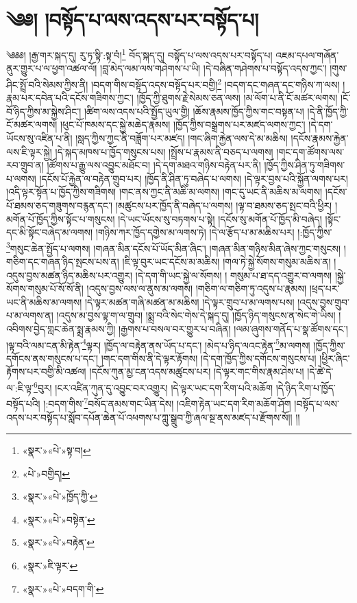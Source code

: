 \chapter{༄༅། །བསྟོད་པ་ལས་འདས་པར་བསྟོད་པ།}༄༅༅། །རྒྱ་གར་སྐད་དུ། རུ་ཏ་སྟི་:སྟ་བཾ།\footnote{«སྣར་»«པེ་»སྟ་བ།} བོད་སྐད་དུ། བསྟོད་པ་ལས་འདས་པར་བསྟོད་པ། འཇམ་དཔལ་གཞོན་ནུར་གྱུར་པ་ལ་ཕྱག་འཚལ་ལོ། །བླ་མེད་ལམ་ལས་གཤེགས་པ་ཡི། །དེ་བཞིན་གཤེགས་པ་བསྟོད་འདས་ཀྱང་། །གུས་ཤིང་སྤྲོ་བའི་སེམས་ཀྱིས་ནི། །བདག་གིས་བསྟོད་འདས་བསྟོད་པར་བགྱི།\footnote{«པེ་»བགྱིད།} །བདག་དང་གཞན་དང་གཉིས་ཀ་ལས། །རྣམ་པར་དབེན་པའི་དངོས་གཟིགས་ཀྱང་། །ཁྱོད་ཀྱི་ཐུགས་རྗེ་སེམས་ཅན་ལས། །མ་ལོག་པ་ནི་ངོ་མཚར་ལགས། །ངོ་བོ་ཉིད་ཀྱིས་མ་སྐྱེས་ཤིང་། །ཚིག་ལས་འདས་པའི་སྤྱོད་ཡུལ་གྱི། །ཆོས་རྣམས་ཁྱོད་ཀྱིས་གང་བསྟན་པ། །དེ་ནི་ཁྱོད་ཀྱི་ངོ་མཚར་ལགས། །ཕུང་པོ་ཁམས་དང་སྐྱེ་མཆེད་རྣམས། །ཁྱོད་ཀྱིས་བསྒྲགས་པར་མཛད་ལགས་ཀྱང་། །དེ་དག་ཡོངས་སུ་འཛིན་པ་ནི། །སླད་ཀྱིས་ཀྱང་ནི་བཟློག་པར་མཛད། །གང་ཞིག་རྐྱེན་ལས་དེ་མ་མཆིས། །དངོས་རྣམས་རྐྱེན་ལས་ཇི་ལྟར་སྐྱེ། །དེ་སྐད་མཁས་པ་ཁྱོད་གསུངས་པས། །སྤྲོས་པ་རྣམས་ནི་བཅད་པ་ལགས། །གང་དག་ཚོགས་ལས་རབ་གྲུབ་ན། །ཚོགས་པ་རྒྱུ་ལས་འབྱུང་མཐོང་བ། །དེ་དག་མཐའ་གཉིས་བརྟེན་པར་ནི། །ཁྱོད་ཀྱིས་ཤིན་ཏུ་གཟིགས་པ་ལགས། །དངོས་པོ་རྐྱེན་ལ་བརྟེན་གྲུབ་པར། །ཁྱོད་ནི་ཤིན་ཏུ་བཞེད་པ་ལགས། །དེ་ལྟར་བྱས་པའི་སྐྱོན་ལགས་པར། །འདི་ལྟར་སྟོན་པ་ཁྱོད་ཀྱིས་གཟིགས། །གང་ནས་ཀྱང་ནི་མཆི་མ་ལགས། །གང་དུ་ཡང་ནི་མཆིས་མ་ལགས། །དངོས་པོ་ཐམས་ཅད་གཟུགས་བརྙན་དང་། །མཚུངས་པར་ཁྱོད་ནི་བཞེད་པ་ལགས། །ལྟ་བ་ཐམས་ཅད་སྤང་བའི་ཕྱིར། །མགོན་པོ་ཁྱོད་ཀྱིས་སྟོང་པ་གསུངས། །དེ་ཡང་ཡོངས་སུ་བཏགས་པ་སྟེ། །དངོས་སུ་མགོན་པོ་ཁྱོད་མི་བཞེད། །སྟོང་དང་མི་སྟོང་བཞེད་མ་ལགས། །གཉིས་ཀར་ཁྱོད་དགྱེས་མ་ལགས་ཏེ། །དེ་ལ་རྩོད་པ་མ་མཆིས་པར། །:ཁྱོད་ཀྱིས་\footnote{«སྣར་»«པེ་»ཁྱོད་ཀྱི་}གསུང་ཆེན་སྤྱོད་པ་ལགས། །གཞན་མིན་དངོས་པོ་ཡོད་མིན་ཞིང་། །གཞན་མིན་གཉིས་མིན་ཞེས་ཀྱང་གསུངས། །གཅིག་དང་གཞན་ཉིད་སྤངས་པས་ན། །ཇི་ལྟ་བུར་ཡང་དངོས་མ་མཆིས། །གལ་ཏེ་སྐྱེ་སོགས་གསུམ་མཆིས་ན། །འདུས་བྱས་མཚན་ཉིད་མཆིས་པར་འགྱུར། །དེ་དག་གི་ཡང་སྐྱེ་ལ་སོགས། །
གསུམ་པ་ཐ་དད་འགྱུར་བ་ལགས། །སྐྱེ་སོགས་གསུམ་པོ་སོ་སོ་ནི། །འདུས་བྱས་ལས་ལ་ནུས་མ་ལགས། །གཅིག་ལ་གཅིག་ཏུ་འདུས་པ་རྣམས། །ཕྲད་པར་ཡང་ནི་མཆིས་མ་ལགས། །དེ་ལྟར་མཚན་གཞི་མཚན་མ་མཆིས། །དེ་ལྟར་གྲུབ་པ་མ་ལགས་པས། །འདུས་བྱས་གྲུབ་པ་མ་ལགས་ན། །འདུས་མ་བྱས་ལྟ་ག་ལ་གྲུབ། །སྨྲ་བའི་སེང་གེས་དེ་སྐད་དུ། །ཁྱོད་ཉིད་གསུངས་ན་སེང་གེ་ཡིས། །འབིགས་བྱེད་གླང་ཆེན་སྨྲ་རྣམས་ཀྱི། །རྒྱགས་པ་བསལ་བར་གྱུར་པ་བཞིན། །ལམ་ཞུགས་གནོད་པ་སྣ་ཚོགས་དང་། །ལྟ་བའི་ལམ་ངན་མི་རྟེན་\footnote{«སྣར་»«པེ་»བསྟེན་}ལྟར། །ཁྱོད་ལ་བརྟེན་ནས་ཡོད་པ་དང་། །མེད་པ་ཉིད་ལའང་རྟེན་\footnote{«སྣར་»«པེ་»བརྟེན་}མ་ལགས། །ཁྱོད་ཀྱིས་དགོངས་ནས་གསུངས་པ་དང་། །གང་དག་གིས་ནི་དེ་ལྟར་རྟོགས། །དེ་དག་ཁྱོད་ཀྱིས་དགོངས་གསུངས་པ། །ཕྱིར་ཞིང་རྟོགས་པར་བགྱི་མི་འཚལ། །དངོས་ཀུན་མྱ་ངན་འདས་མཚུངས་པར། །དེ་ལྟར་གང་གིས་རྣམ་ཤེས་པ། །དེ་ཚེ་དེ་ལ་:ཇི་ལྟ་\footnote{«སྣར་»ཇི་ལྟར་}བུར། །ངར་འཛིན་ཀུན་དུ་འབྱུང་བར་འགྱུར། །དེ་ལྟར་ཡང་དག་རིག་པའི་མཆོག །དེ་ཉིད་རིག་པ་ཁྱོད་བསྟོད་པའི། །:བདག་གིས་\footnote{«སྣར་»«པེ་»བདག་གི་}བསོད་ནམས་གང་ཡིན་དེས། །འཇིག་རྟེན་ཡང་དག་རིག་མཆོག་ཤོག །བསྟོད་པ་ལས་འདས་པར་བསྟོད་པ་སློབ་དཔོན་ཆེན་པོ་འཕགས་པ་ཀླུ་སྒྲུབ་ཀྱི་ཞལ་སྔ་ནས་མཛད་པ་རྫོགས་སོ།། །།